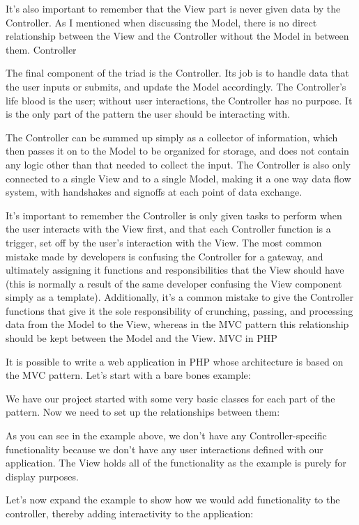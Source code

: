 \documentclass[a4paper,openany,twoside,final]{book}
\begin{document}
It’s also important to remember that the View part is never given data by the Controller. As I mentioned when discussing the Model, there is no direct relationship between the View and the Controller without the Model in between them.
Controller

The final component of the triad is the Controller. Its job is to handle data that the user inputs or submits, and update the Model accordingly. The Controller’s life blood is the user; without user interactions, the Controller has no purpose. It is the only part of the pattern the user should be interacting with.

The Controller can be summed up simply as a collector of information, which then passes it on to the Model to be organized for storage, and does not contain any logic other than that needed to collect the input. The Controller is also only connected to a single View and to a single Model, making it a one way data flow system, with handshakes and signoffs at each point of data exchange.

It’s important to remember the Controller is only given tasks to perform when the user interacts with the View first, and that each Controller function is a trigger, set off by the user’s interaction with the View. The most common mistake made by developers is confusing the Controller for a gateway, and ultimately assigning it functions and responsibilities that the View should have (this is normally a result of the same developer confusing the View component simply as a template). Additionally, it’s a common mistake to give the Controller functions that give it the sole responsibility of crunching, passing, and processing data from the Model to the View, whereas in the MVC pattern this relationship should be kept between the Model and the View.
MVC in PHP

It is possible to write a web application in PHP whose architecture is based on the MVC pattern. Let’s start with a bare bones example:


We have our project started with some very basic classes for each part of the pattern. Now we need to set up the relationships between them:


As you can see in the example above, we don’t have any Controller-specific functionality because we don’t have any user interactions defined with our application. The View holds all of the functionality as the example is purely for display purposes.

Let’s now expand the example to show how we would add functionality to the controller, thereby adding interactivity to the application:
\end{document}
